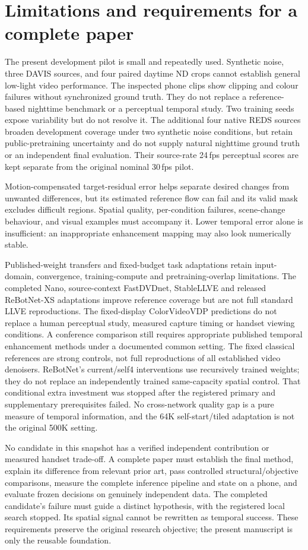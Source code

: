 \section{Limitations and requirements for a complete paper}
The present development pilot is small and repeatedly used. Synthetic
noise, three DAVIS sources, and four paired daytime ND crops cannot
establish general low-light video performance. The inspected phone clips
show clipping and colour failures without synchronized ground truth.
They do not replace a reference-based nighttime benchmark or a perceptual
temporal study. Two training seeds expose variability but do not resolve it.
The additional four native REDS sources broaden development coverage under
two synthetic noise conditions, but retain public-pretraining uncertainty
and do not supply natural nighttime ground truth or an independent final
evaluation. Their source-rate 24\,fps perceptual scores are kept separate
from the original nominal 30\,fps pilot.

Motion-compensated target-residual error helps separate desired changes
from unwanted differences, but its estimated reference flow can fail and
its valid mask excludes difficult regions. Spatial quality, per-condition
failures, scene-change behaviour, and visual examples must accompany it.
Lower temporal error alone is insufficient: an inappropriate enhancement
mapping may also look numerically stable.

Published-weight transfers and fixed-budget task adaptations retain
input-domain, convergence, training-compute and pretraining-overlap
limitations. The completed Nano, source-context FastDVDnet, StableLLVE and
released ReBotNet-XS adaptations
improve reference coverage but are not full standard LLVE reproductions.
The fixed-display ColorVideoVDP predictions do not replace a human
perceptual study, measured capture timing or handset viewing conditions.
A conference comparison still requires appropriate published temporal
enhancement methods under a documented common setting.
The fixed classical references are strong controls, not full reproductions
of all established video denoisers.
ReBotNet's current/self4 interventions use recursively trained weights;
they do not replace an independently trained same-capacity spatial
control. That conditional extra investment was stopped after the
registered primary and supplementary prerequisites failed. No
cross-network quality gap is a pure measure of temporal information,
and the 64K self-start/tiled adaptation is not the original 500K setting.

No candidate in this snapshot has a verified independent contribution or
measured handset trade-off. A complete paper must establish the final method,
explain its difference from relevant prior art, pass controlled
structural/objective comparisons, measure
the complete inference pipeline and state on a phone, and evaluate frozen
decisions on genuinely independent data. The completed candidate's failure
must guide a distinct hypothesis, with the registered local search stopped.
Its spatial signal cannot be rewritten as temporal success. These
requirements preserve the original research objective;
the present manuscript is only the reusable foundation.
